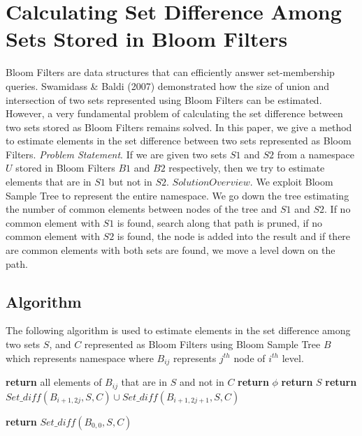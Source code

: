 \documentclass[a4paper]{article}
\begin{document}
\section{Calculating Set Difference Among Sets Stored in Bloom Filters}

Bloom Filters {\cite{2}} are data structures that can efficiently answer set-membership queries.  Swamidass \& Baldi (2007) {\cite{3}} demonstrated how the size of union and intersection of two sets represented using Bloom Filters can be estimated. However, a very fundamental problem of calculating the set difference between two sets stored as Bloom Filters remains solved. In this paper, we give a method to estimate elements in the set difference between two sets represented as Bloom Filters. \newline
\textit{Problem Statement}. If we are given two sets $S1$ and $S2$ from a namespace $U$ stored in Bloom Filters $B1$ and $B2$ respectively, then we try to estimate elements that are in $S1$ but not in $S2$. \newline
$Solution Overview.$ We exploit Bloom Sample Tree {\cite{1}} to represent the entire namespace. We go down the tree estimating the number of common elements between nodes of the tree and $S1$ and $S2$. If no common element with $S1$ is found, search along that path is pruned, if no common element with $S2$ is found, the node is added into the result and if there are common elements with both sets are found, we move a level down on the path.

\subsection{Algorithm}
The following algorithm is used to estimate elements in the set difference among two sets $S$, and $C$ represented as Bloom Filters using Bloom Sample Tree $B$ which represents namespace where $B_{ij}$ represents $j^{th}$ node of $i^{th}$ level.

\begin{algorithm}
\caption{$Set\_diff (B_{ij}, S, C)$}
\begin{algorithmic}[1]
    \State \textbf{return} all elements of $B_{ij}$ that are in $S$ and not in $C$
    \State  \textbf{return} $\phi$
    \State  \textbf{return} $S$
    \Else 
    \State
    \textbf{return} $Set\_diff (B_{i+1,2j}, S, C) \cup Set\_diff (B_{i+1,2j+1}, S, C)$
  \EndIf
\EndProcedure
\end{algorithmic}
\end{algorithm}
\begin{algorithm}
\caption{$Set\_difference (B_{ij}, S, C)$}
\begin{algorithmic}[1]
 \State 
 \textbf{return} $Set\_diff (B_{0,0}, S, C)$
\EndProcedure
\end{algorithmic}
\end{algorithm}
\end{document}
